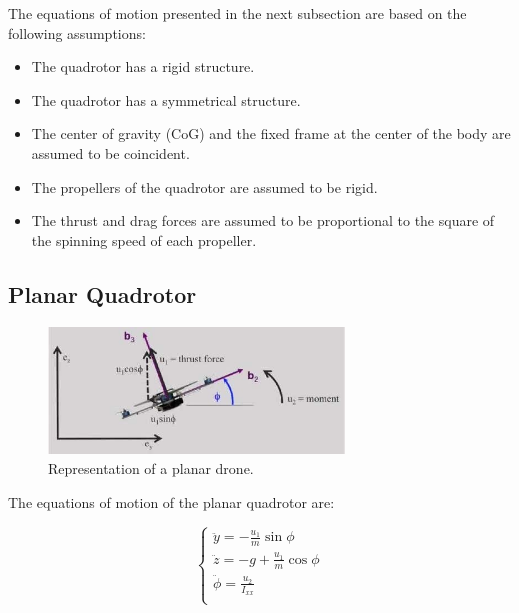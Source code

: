 \documentclass{thesisreport}
\begin{document}
The equations of motion presented in the next subsection are based on the following assumptions:

\begin{itemize}
	\item The quadrotor has a rigid structure.
	\item The quadrotor has a symmetrical structure.
	\item The center of gravity (CoG) and the fixed frame at the center of the body are assumed to be coincident.
	\item The propellers of the quadrotor are assumed to be rigid.
	\item The thrust and drag forces are assumed to be proportional to the square of the spinning speed of each propeller.
\end{itemize}




















\subsection{Planar Quadrotor}

\begin{figure}[h]
	\centering
	\includegraphics[width=0.7\textwidth]{Images/dynamics/planar_quadrotor.jpg}
	\caption{Representation of a planar drone. \cite{planar_quadrotor_figure}}
\end{figure}

The equations of motion of the planar quadrotor are:

\begin{equation}\label{dynamics_planar_quadrotor}
 \begin{cases} 
       \ddot{y} = - \frac{u_1}{m} \sin{\phi} \\
       \ddot{z} = - g + \frac{u_1}{m} \cos{\phi} \\
       \ddot{\phi} = \frac{u_2}{I_{xx}} \\
   \end{cases}
\end{equation}
\end{document}
